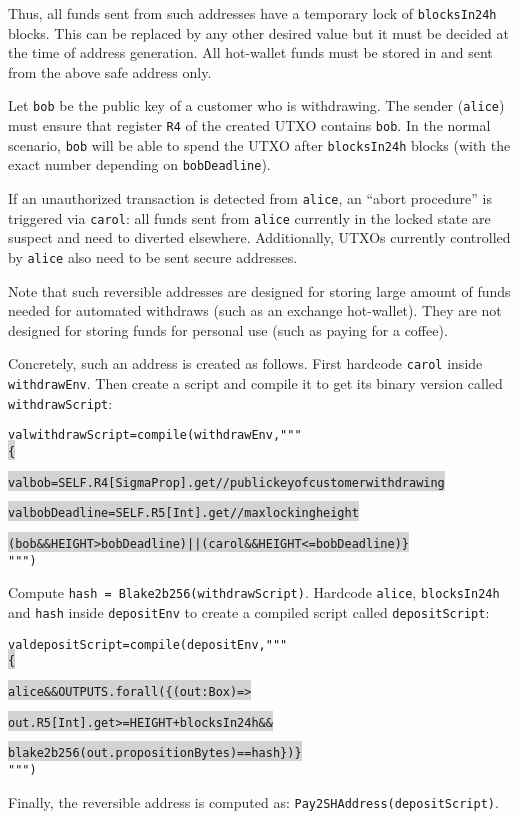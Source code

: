 \documentclass[11pt]{article}
\newcommand\Hi[2][lightgray]{%
	\hspace*{-\fboxsep}%
	\colorbox{#1}{#2}%
	\hspace*{-\fboxsep}%
}
\begin{document}
Thus, all funds sent from such addresses have a temporary lock of \texttt{blocksIn24h} blocks. This can be replaced by any other desired value but it must be decided at the time of address generation. All hot-wallet funds must be stored in and sent from the above safe address only. 

Let \texttt{bob} be the public key of a customer who is withdrawing. The sender (\texttt{alice}) must ensure that register \texttt{R4} of the created UTXO contains \texttt{bob}. In the normal scenario, \texttt{bob} will be able to spend the UTXO after \texttt{blocksIn24h} blocks (with the exact number depending on \texttt{bobDeadline}). 

If an unauthorized transaction is detected from \texttt{alice}, an ``abort procedure'' is triggered via \texttt{carol}: all funds sent from \texttt{alice} currently in the locked state are suspect and need to diverted elsewhere. Additionally, UTXOs currently controlled by \texttt{alice} also need to be sent secure addresses. 

Note that such reversible addresses are designed for storing large amount of funds needed for automated withdraws (such as an exchange hot-wallet). They are not designed for storing funds for personal use (such as paying for a coffee).

Concretely, such an address is created as follows. First hardcode \texttt{carol} inside \texttt{withdrawEnv}. Then create a script and compile it to get its binary version called \texttt{withdrawScript}:
\begin{alltt}
val withdrawScript = compile(withdrawEnv, """ \Hi{\{}
  \Hi{val bob         = SELF.R4[SigmaProp].get // public key of customer withdrawing}
  \Hi{val bobDeadline = SELF.R5[Int].get       // max locking height}
  \Hi{(bob && HEIGHT > bobDeadline) || (carol && HEIGHT <= bobDeadline) \}} """)
\end{alltt}

Compute \texttt{hash = Blake2b256(withdrawScript)}. Hardcode \texttt{alice}, \texttt{blocksIn24h} and \texttt{hash} inside \texttt{depositEnv} to create a compiled script called \texttt{depositScript}:

\begin{alltt}
	val depositScript = compile(depositEnv, """ \Hi{\{}
  \Hi{alice && OUTPUTS.forall( \{(out:Box) =>}
    \Hi{out.R5[Int].get >= HEIGHT + blocksIn24h && }
    \Hi{blake2b256(out.propositionBytes) == hash\} ) \}} """)
\end{alltt}

Finally, the reversible address is computed as: \texttt{Pay2SHAddress(depositScript)}.
\end{document}
